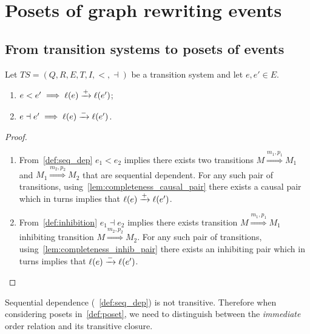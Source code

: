 \section{Posets of graph rewriting events}

\subsection{From transition systems to posets of events}

\begin{lemma}
  \label{lemma:pos_infl}
  Let $TS = (Q,R,E,T,I,<,\dashv)$ be a transition system and let $e,e' \in E$.
  \begin{enumerate}
  \item $e< e'\implies \ell(e)\xrightarrow{+}\ell(e')$;
  \item $e\dashv e' \implies\ell(e)\xrightarrow{-}\ell(e')$.
  \end{enumerate}
\end{lemma}
\begin{proof}
  \begin{enumerate}
  \item From~\autoref{def:seq_dep} $e_1 < e_2$ implies there exists two transitions $M\overset{m_1,p_1}{\Rightarrow} M_1$ and $M_1\overset{m_2,p_2}{\Rightarrow} M_2$ that are sequential dependent. For any such pair of transitions, using~\autoref{lem:completeness_causal_pair} there exists a causal pair which in turns implies that $\ell(e)\xrightarrow{+}\ell(e')$.

  \item From~\autoref{def:inhibition} $e_1 \dashv e_2$ implies there exists transition $M\overset{m_1,p_1}{\Rightarrow} M_1$ inhibiting transition $M\overset{m_2,p_2}{\Rightarrow} M_2$. For any such pair of transitions, using~\autoref{lem:completeness_inhib_pair} there exists an inhibiting pair which in turns implies that $\ell(e)\xrightarrow{-}\ell(e')$.
  \end{enumerate}
\end{proof}

\begin{remark}
  Sequential dependence (~\autoref{def:seq_dep}) is not transitive. Therefore when considering posets in~\autoref{def:poset}, we need to distinguish between the \emph{immediate} order relation and its transitive closure.
\end{remark}

